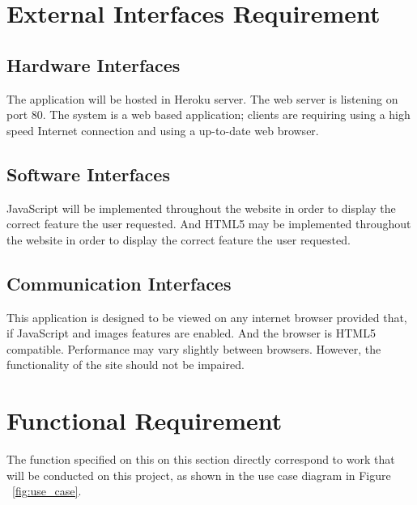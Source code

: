 
\section{External Interfaces Requirement}

\subsection{Hardware Interfaces}

The application will be hosted in Heroku server. The web server is listening on port 80. The system is a web based application; clients are requiring using a high speed Internet connection and using a up-to-date web browser.

\subsection{Software Interfaces}

JavaScript will be implemented throughout the website in order to display the correct feature the user requested. And HTML5 may be implemented throughout the website in order to display the correct feature the user requested.

\subsection{Communication Interfaces}

This application is designed to be viewed on any internet browser provided that, if JavaScript and images features are enabled. And the browser is HTML5 compatible. Performance may vary slightly between browsers. However, the functionality of the site should not be impaired.

\section{Functional Requirement}

The function specified on this on this section directly correspond to work that will be conducted on this project, as shown in the use case diagram in Figure ~\ref{fig:use_case}. 

